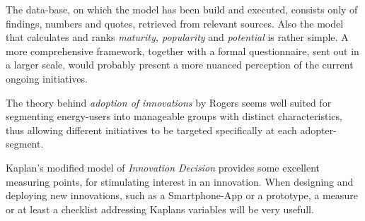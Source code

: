 \documentclass[journal]{IEEEtran}
\begin{document}
The data-base, on which the model has been build and executed, consists only of findings, numbers and quotes, retrieved from relevant sources. Also the model that calculates and ranks \textit{maturity, popularity} and \textit{potential} is rather simple. A more comprehensive framework, together with a formal questionnaire, sent out in a larger scale, would probably present a more nuanced perception of the current ongoing initiatives.

The theory behind \textit{adoption of innovations} by Rogers seems well suited for segmenting energy-users into manageable groups with distinct characteristics, thus allowing different initiatives to be targeted specifically at each adopter-segment.

Kaplan's modified model of \textit{Innovation Decision} provides some excellent measuring points, for stimulating interest in an innovation. When designing and deploying new innovations, such as a Smartphone-App or a prototype, a measure or at least a checklist addressing Kaplans variables will be very usefull.




\newpage


%
%
%
\end{document}
